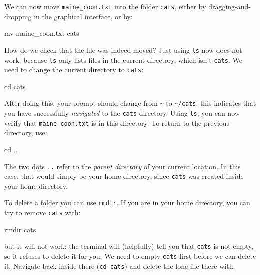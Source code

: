 \documentclass[10pt]{article}
\begin{document}
We can now move \texttt{maine\_coon.txt} into the folder \texttt{cats}, either by dragging-and-dropping in the graphical interface, or by:

\begin{cmdline}
mv maine_coon.txt cats
\end{cmdline}

How do we check that the file was indeed moved? Just using \texttt{ls} now does not work, because \texttt{ls} only lists files in the current directory, which isn't \texttt{cats}. We need to change the current directory to \texttt{cats}:

\begin{cmdline}
cd cats
\end{cmdline}

After doing this, your prompt should change from \texttt{\textasciitilde} to \texttt{\textasciitilde /cats}: this indicates that you have successfully \textit{navigated} to the \texttt{cats} directory. Using \texttt{ls}, you can now verify that \texttt{maine\_coon.txt} is in this directory. To return to the previous directory, use:

\begin{cmdline}
cd ..
\end{cmdline}

The two dots \texttt{..} refer to the \textit{parent directory} of your current location. In this case, that would simply be your home directory, since \texttt{cats} was created inside your home directory.

To delete a folder you can use \texttt{rmdir}. If you are in your home directory, you can try to remove \texttt{cats} with:

\begin{cmdline}
rmdir cats
\end{cmdline}

but it will not work: the terminal will (helpfully) tell you that \texttt{cats} is not empty, so it refuses to delete it for you. We need to empty \texttt{cats} first before we can delete it. Navigate back inside there (\texttt{cd cats}) and delete the lone file there with:
\end{document}
